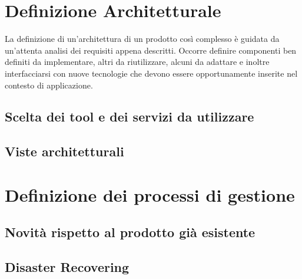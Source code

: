 \section{Definizione Architetturale}
La definizione di un'architettura di un prodotto così complesso è guidata da un'attenta analisi dei requisiti appena descritti. Occorre definire componenti ben definiti da implementare, altri da riutilizzare, alcuni da adattare e inoltre interfacciarsi con nuove tecnologie che devono essere opportunamente inserite nel contesto di applicazione.
\subsection{Scelta dei tool e dei servizi da utilizzare}
\subsection{Viste architetturali}

\section{Definizione dei processi di gestione}
\subsection{Novità rispetto al prodotto già esistente}
\subsection{Disaster Recovering}
